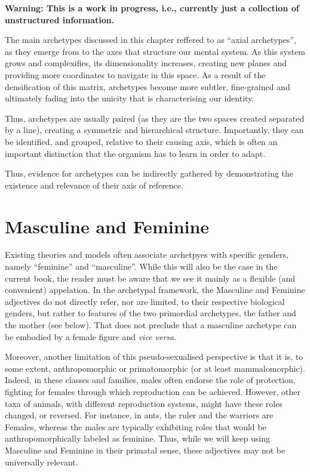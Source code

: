 \documentclass[]{book}
\begin{document}
\textbf{Warning: This is a work in progress, i.e., currently just a collection of unstructured information.}

The main archetypes discussed in this chapter reffered to as ``axial archetypes'', as they emerge from to the axes that structure our mental system. As this system grows and complexifies, its dimensionality increases, creating new planes and providing more coordinates to navigate in this space. As a result of the densification of this matrix, archetypes become more subtler, fine-grained and ultimately fading into the unicity that is characterising our identity.

Thus, archetypes are usually paired (as they are the two spaces created separated by a line), creating a symmetric and hierarchical structure. Importantly, they can be identified, and grouped, relative to their causing axis, which is often an important distinction that the organism has to learn in order to adapt.

Thus, evidence for archetypes can be indirectly gathered by demonstrating the existence and relevance of their axis of reference.

\hypertarget{masculine-and-feminine}{%
\section{Masculine and Feminine}\label{masculine-and-feminine}}

Existing theories and models often associate archetpyes with specific genders, namely ``feminine'' and ``masculine''. While this will also be the case in the current book, the reader must be aware that we see it mainly as a flexible (and convenient) appelation. In the archetypal framework, the Masculine and Feminine adjectives do not directly refer, nor are limited, to their respective biological genders, but rather to features of the two primordial archetypes, the father and the mother (see below). That does not preclude that a masculine archetype can be embodied by a female figure and \emph{vice versa}.

Moreover, another limitation of this pseudo-sexualised perspective is that it is, to some extent, anthropomorphic or primatomorphic (or at least mammalomorphic). Indeed, in these classes and families, males often endorse the role of protection, fighting for females through which reproduction can be achieved. However, other taxa of animals, with different reproduction systems, might have these roles changed, or reversed. For instance, in ants, the ruler and the warriors are Females, whereas the males are typically exhibiting roles that would be anthropomorphically labeled as feminine. Thus, while we will keep using Masculine and Feminine in their primatal sense, these adjectives may not be universally relevant.
\end{document}

